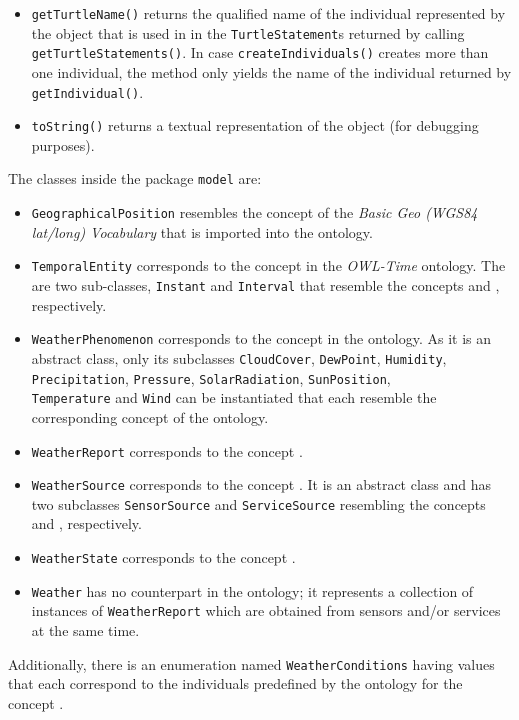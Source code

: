 \begin{itemize}
  \item \texttt{getTurtleName()} returns the qualified name of the individual represented by the object that is used in in the \texttt{TurtleStatement}s returned by calling \texttt{get\hspace{0pt}Turtle\hspace{0pt}Statements()}. In case \texttt{createIndividuals()} creates more than one individual, the method only yields the name of the individual returned by \texttt{getIndividual()}.
  
  \item \texttt{toString()} returns a textual representation of the object (for debugging purposes).
\end{itemize}

The classes inside the package \texttt{model} are:
\begin{itemize}
  \item \texttt{GeographicalPosition} resembles the concept  of the \emph{Basic Geo (WGS84 lat/long) Vocabulary}\cite{wgs84_vocabulary} that is imported into the \smarthomeweather ontology.
  
  \item \texttt{TemporalEntity} corresponds to the concept  in the \emph{OWL-Time}\cite{owl-time} ontology. The are two sub-classes, \texttt{Instant} and \texttt{Interval} that resemble the concepts  and , respectively.
  
  \item \texttt{WeatherPhenomenon} corresponds to the concept  in the \smarthomeweather ontology. As it is an abstract class, only its subclasses \texttt{CloudCover}, \texttt{DewPoint}, \texttt{Humidity}, \texttt{Precipitation}, \texttt{Pressure}, \texttt{SolarRadiation}, \texttt{SunPosition}, \\ \texttt{Temperature} and \texttt{Wind} can be instantiated that each resemble the corresponding concept of the ontology.
  
  \item \texttt{WeatherReport} corresponds to the concept .
  
  \item \texttt{WeatherSource} corresponds to the concept . It is an abstract class and has two subclasses \texttt{SensorSource} and \texttt{ServiceSource} resembling the concepts  and , respectively.
  
  \item \texttt{WeatherState} corresponds to the concept .
  
  \item \texttt{Weather} has no counterpart in the ontology; it represents a collection of instances of \texttt{WeatherReport} which are obtained from sensors and/or services at the same time.
\end{itemize}
% 
Additionally, there is an enumeration named \texttt{WeatherConditions} having values that each correspond to the individuals predefined by the ontology for the concept .

